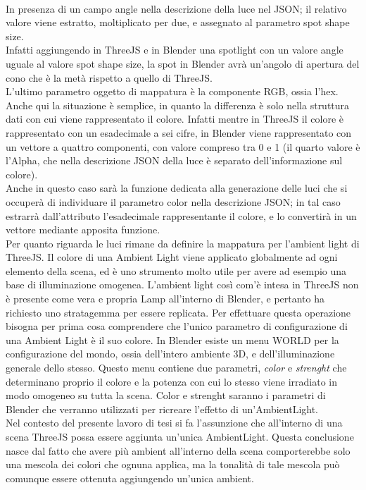 \\
In presenza di un campo angle nella descrizione della luce nel JSON; il relativo valore viene estratto, moltiplicato per due, e assegnato al parametro spot shape size. 
\\
Infatti aggiungendo in ThreeJS e in Blender una spotlight con un valore angle uguale al valore spot shape size, la spot in Blender avrà un’angolo di apertura del cono che è la metà rispetto a quello di ThreeJS.
\\
L’ultimo parametro oggetto di mappatura è la componente RGB, ossia l’hex. Anche qui la situazione è semplice, in quanto la differenza è solo nella struttura dati con cui viene rappresentato il colore. Infatti mentre in ThreeJS il colore è rappresentato con un esadecimale a sei cifre, in Blender viene rappresentato con un vettore a quattro componenti, con valore compreso tra 0 e 1 (il quarto valore è l’Alpha, che nella descrizione JSON della luce è separato dell’informazione sul colore). 
\\
Anche in questo caso sarà la funzione dedicata alla generazione delle luci che si occuperà di individuare il parametro color nella descrizione JSON; in tal caso estrarrà dall’attributo l’esadecimale rappresentante il colore, e lo convertirà in un vettore mediante apposita funzione. 
\\
Per quanto riguarda le luci rimane da definire la mappatura per l’ambient light di ThreeJS.
Il colore di una Ambient Light viene applicato globalmente ad ogni elemento della scena, ed è uno strumento molto utile per avere ad esempio una base di illuminazione omogenea. L’ambient light così com’è intesa in ThreeJS non è presente come vera e propria Lamp all’interno di Blender, e pertanto ha richiesto uno stratagemma per essere replicata. Per effettuare questa operazione bisogna per prima cosa comprendere che l’unico parametro di configurazione di una Ambient Light è il suo colore. In Blender esiste un menu WORLD per la configurazione del mondo, ossia dell’intero ambiente 3D, e dell’illuminazione generale dello stesso. Questo menu contiene due parametri, \emph{color} e \emph{strenght} che determinano proprio il colore e la potenza con cui lo stesso viene irradiato in modo omogeneo su tutta la scena. Color e strenght saranno i parametri di Blender che verranno utilizzati per ricreare l’effetto di un’AmbientLight.
\\
Nel contesto del presente lavoro di tesi si fa l’assunzione che all’interno di una scena ThreeJS possa essere aggiunta un’unica AmbientLight. Questa conclusione nasce dal fatto che avere più ambient all’interno della scena comporterebbe solo una mescola dei colori che ognuna applica, ma la tonalità di tale mescola può comunque essere ottenuta aggiungendo un’unica ambient.
